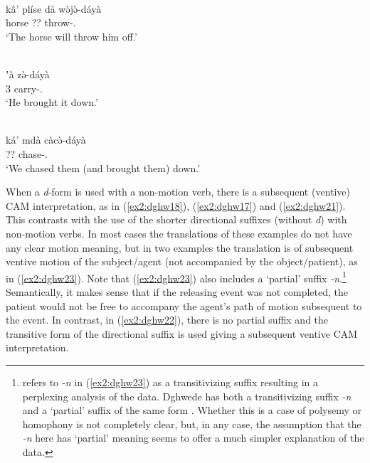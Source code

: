 \ea\label{ex2:dghw15}
 \\
\gll  kâ' plíse dà wə̀jə̀-dáyà \\ 
 horse ?? throw-. \\
\glt `The horse will throw him off.'

\ex\label{ex2:dghw16}
 \\
\gll ʽà zə̀-dáyà	\\
3 carry-.	\\
\glt `He brought it down.'

\ex\label{ex2:dghw17}
 \\
\gll  ká' mdà càcə̀-dáyà \\
 ?? chase-.	\\
\glt `We chased them (and brought them) down.'
\z 

When a \textit{d}-form is used with a non-motion verb, there is a subsequent (ventive) CAM interpretation, as in (\ref{ex2:dghw18}), (\ref{ex2:dghw17}) and (\ref{ex2:dghw21}). This contrasts with the use of the shorter directional suffixes (without \textit{d}) with non-motion verbs. In most cases the translations of these examples do not have any clear motion meaning, but in two examples the translation is of subsequent ventive motion of the subject/agent (not accompanied by the object/patient), as in (\ref{ex2:dghw23}). Note that (\ref{ex2:dghw23}) also includes a `partial' suffix \textit{-n}.\footnote{\citet[27]{frickVerbalSystemDghwede1978} refers to \textit{-n} in (\ref{ex2:dghw23}) as a transitivizing suffix resulting in a perplexing analysis of the data. Dghwede has both a transitivizing suffix \textit{-n} and a `partial' suffix of the same form \citep[14, 16]{frickVerbalSystemDghwede1978}. Whether this is a case of polysemy or homophony is not completely clear, but, in any case, the assumption that the \textit{-n} here has `partial' meaning seems to offer a much simpler explanation of the data.} Semantically, it makes sense that if the releasing event was not completed, the patient would not be free to accompany the agent's path of motion subsequent to the event. In contrast, in (\ref{ex2:dghw22}), there is no partial suffix and the transitive form of the directional suffix is used giving a subsequent ventive CAM interpretation. 

